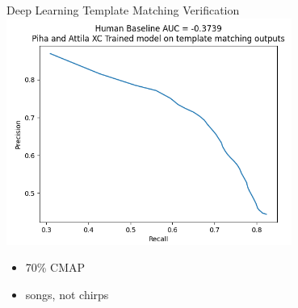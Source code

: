 \begin{frame}{Deep Learning Template Matching Verification}
    \centering
    \includegraphics[height=0.7\textheight,width=0.7\textwidth,keepaspectratio]{images/TMV-precision-recall.png}
    \begin{itemize}
        \item 70\% CMAP
        \item songs, not chirps
    \end{itemize}
\end{frame}

